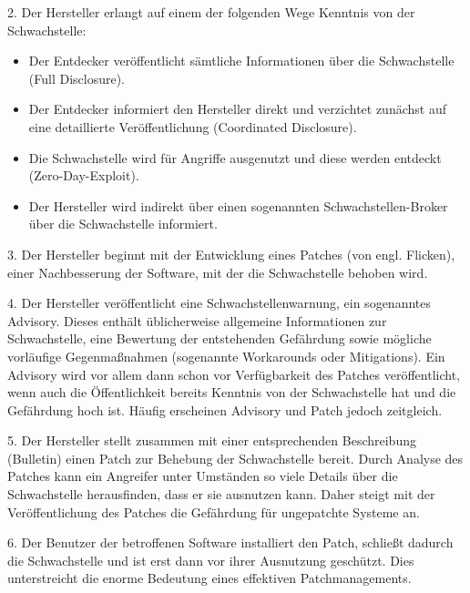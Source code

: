 \documentclass[12pt,oneside,a4paper,parskip]{scrbook}
\begin{document}
  2. Der Hersteller erlangt auf einem der folgenden Wege Kenntnis von der Schwachstelle:
  \begin{itemize}
    \item Der Entdecker veröffentlicht sämtliche Informationen über die Schwachstelle (\glqq Full Disclosure\grqq).
    \item Der Entdecker informiert den Hersteller direkt und verzichtet zunächst auf eine detaillierte
    Veröffentlichung (\glqq Coordinated Disclosure\grqq).
    \item Die Schwachstelle wird für Angriffe ausgenutzt und diese werden entdeckt (\glqq Zero-Day-Exploit\grqq).
    \item Der Hersteller wird indirekt über einen sogenannten Schwachstellen-Broker über die Schwachstelle informiert.
  \end{itemize}
  3. Der Hersteller beginnt mit der Entwicklung eines Patches (von engl. Flicken), einer Nachbesserung der Software, mit der die Schwachstelle behoben wird.

  4. Der Hersteller veröffentlicht eine Schwachstellenwarnung, ein sogenanntes Advisory. Dieses
  enthält üblicherweise allgemeine Informationen zur Schwachstelle, eine Bewertung der
  entstehenden Gefährdung sowie mögliche vorläufige Gegenmaßnahmen (sogenannte
  Workarounds oder Mitigations). Ein Advisory wird vor allem dann schon vor Verfügbarkeit
  des Patches veröffentlicht, wenn auch die Öffentlichkeit bereits Kenntnis von der Schwachstelle hat und die Gefährdung hoch ist. Häufig erscheinen Advisory und Patch jedoch zeitgleich.

  5. Der Hersteller stellt zusammen mit einer entsprechenden Beschreibung (Bulletin) einen
  Patch zur Behebung der Schwachstelle bereit. Durch Analyse des Patches kann ein Angreifer
  unter Umständen so viele Details über die Schwachstelle herausfinden, dass er sie ausnutzen
  kann. Daher steigt mit der Veröffentlichung des Patches die Gefährdung für ungepatchte
  Systeme an.

  6. Der Benutzer der betroffenen Software installiert den Patch, schließt dadurch die Schwachstelle und ist erst dann vor ihrer Ausnutzung geschützt. Dies unterstreicht die enorme Bedeutung eines effektiven Patchmanagements.\\
\end{document}
